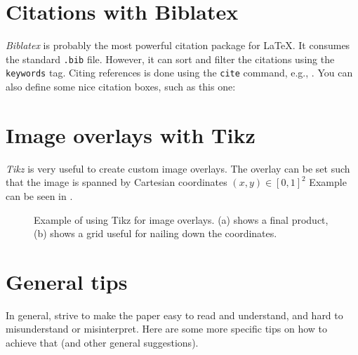 \section{Citations with Biblatex}

\emph{Biblatex} is probably the most powerful citation package for LaTeX.
It consumes the standard \texttt{.bib} file. However, it can sort and filter the citations using the \texttt{keywords} tag.
Citing references is done using the \texttt{cite} command, e.g., \cite{baca2021mrs}.
You can also define some nice citation boxes, such as this one:

\section{Image overlays with Tikz}

\emph{Tikz} is very useful to create custom image overlays.
The overlay can be set such that the image is spanned by Cartesian coordinates $\left(x, y\right) \in \left[0, 1\right]^2$
Example can be seen in .

\begin{figure}[!t]

  \centering

  

  \caption{Example of using Tikz for image overlays. (a) shows a final product, (b) shows a grid useful for nailing down the coordinates.}
  \label{fig:tikz_overlay}

\end{figure}

\section{General tips}

In general, strive to make the paper easy to read and understand, and hard to misunderstand or misinterpret.
Here are some more specific tips on how to achieve that (and other general suggestions).

